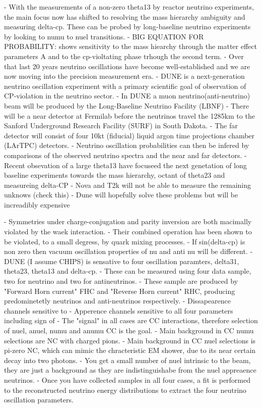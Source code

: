 - With the measurements of a non-zero theta13 by reactor neutrino experiments, the main focus now
has shifted to resolving the mass hierarchy ambiguity and measuring delta-cp. These can be probed
by long-baseline neutrino experiments by looking to numu to nuel transitions.
- BIG EQUATION FOR PROBABILITY: shows sensitivity to the mass hiearchy through the matter effect
parameters A and to the cp-violtating phase trhough the second term.
- Over that last 20 years neutrino oscillations have become well-established and we are now moving
into the precision measurement era.
- DUNE is a next-generation neutrino oscillation experiment with a primary scientific goal of
observation of CP-violation in the neutrino sector.
- In DUNE a muon neutrino(anti-neutrino) beam will be produced by the Long-Baseline Neutrino
Facility (LBNF)
- There will be a near detector at Fermilab before the neutrinos travel the 1285km to the Sanford
Underground Research Facility (SURF) in South Dakota.
- The far detector will consist of four 10kt (fiducial) liquid argon time projections chamber
(LArTPC) detectors.
- Neutrino oscillation probabilities can then be infered by comparisons of the observed neutrino
spectra and the near and far detectors.
- Recent obsevation of a large theta13 have focuseed the next genetation of long baseline
experiments towards the mass hierarchy, octant of theta23 and measureing delta-CP
- Nova and T2k will not be able to measure the remaining unknows (check this)
- Dune will hopefully solve these problems but will be increadibly expensive

- Symmetries under charge-conjugation and parity inversion are both macimally violated by the
waek interaction.
- Their combined operation has been shown to be violated, to a small degress, by quark mixing
processes.
- If sin(delta-cp) is non zero then vacuum oscillation properties of nu and anti nu will be
different.
- DUNE (I assume CHIPS) is sensative to four oscillation paramters, delta31, theta23, theta13
and delta-cp.
- These can be measured using four data sample, two for neutrino and two for antineutrinos.
- These sample are produced by "Forward Horn current" FHC and "Reverse Horn current" RHC,
producing predominetetly neutrinos and anti-neutrinos respectively.
- Dissapearence channels sensitive to %
- Apperence channels sensitive to all four parameters including sign of %
- The "signal" in all cases are CC interactions, therefore selection of nuel, anuel, numu and
anumu CC is the goal.
- Main background in CC numu selections are NC with charged pions.
- Main background in CC nuel selections is pi-zero NC, which can mimic the chracteristic EM
shower, due to its near certain decay into two photons.
- You get a small number of nuel intrinsic to the beam, they are just a background as they are
indistinguishabe from the nuel appreaence neutrinos.
- Once you have collected samples in all four cases, a fit is performed to the reconstructed
neutrino energy distributions to extract the four neutrino oscillation parameters.